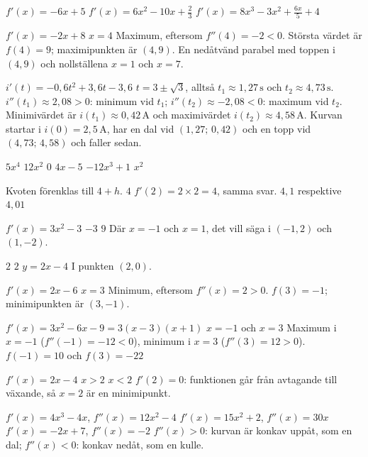 
\begin{facit}

  $f'(x) = -6x + 5$  $f'(x) = 6x^2 - 10x + \frac{2}{3}$
 $f'(x) = 8x^3 - 3x^2 + \frac{6x}{5} + 4$

  $f'(x) = -2x + 8$  $x = 4$  Maximum, eftersom
$f''(4) = -2 < 0$.  Största värdet är $f(4) = 9$; maximipunkten är $(4, 9)$.
 En nedåtvänd parabel med toppen i $(4, 9)$ och nollställena $x = 1$ och $x = 7$.

  $i'(t) = -0{,}6t^2 + 3{,}6t - 3{,}6$
 $t = 3 \pm \sqrt{3}$, alltså $t_1 \approx 1{,}27\,\text{s}$ och
$t_2 \approx 4{,}73\,\text{s}$.
 $i''(t_1) \approx 2{,}08 > 0$: minimum vid $t_1$; $i''(t_2) \approx -2{,}08 < 0$:
maximum vid $t_2$.
 Minimivärdet är $i(t_1) \approx 0{,}42\,\text{A}$ och maximivärdet
$i(t_2) \approx 4{,}58\,\text{A}$.
 Kurvan startar i $i(0) = 2{,}5\,\text{A}$, har en dal vid $(1{,}27;\, 0{,}42)$ och en topp
vid $(4{,}73;\, 4{,}58)$ och faller sedan.

  $5x^4$  $12x^2$  $0$  $4x - 5$  $-12x^3 + 1$
 $x^2$

  Kvoten förenklas till $4 + h$.  $4$
 $f'(2) = 2 \times 2 = 4$, samma svar.  $4{,}1$ respektive $4{,}01$

  $f'(x) = 3x^2 - 3$  $-3$  $9$
 Där $x = -1$ och $x = 1$, det vill säga i $(-1, 2)$ och $(1, -2)$.

  $2$  $2$  $y = 2x - 4$  I punkten $(2, 0)$.

  $f'(x) = 2x - 6$  $x = 3$  Minimum, eftersom $f''(x) = 2 > 0$.
 $f(3) = -1$; minimipunkten är $(3, -1)$.

  $f'(x) = 3x^2 - 6x - 9 = 3(x - 3)(x + 1)$  $x = -1$ och $x = 3$
 Maximum i $x = -1$ ($f''(-1) = -12 < 0$), minimum i $x = 3$ ($f''(3) = 12 > 0$).
 $f(-1) = 10$ och $f(3) = -22$

  $f'(x) = 2x - 4$  $x > 2$  $x < 2$
 $f'(2) = 0$: funktionen går från avtagande till växande, så $x = 2$ är en minimipunkt.

  $f'(x) = 4x^3 - 4x$, $f''(x) = 12x^2 - 4$
 $f'(x) = 15x^2 + 2$, $f''(x) = 30x$  $f'(x) = -2x + 7$, $f''(x) = -2$
 $f''(x) > 0$: kurvan är konkav uppåt, som en dal; $f''(x) < 0$: konkav nedåt, som en
kulle.


\end{facit}
